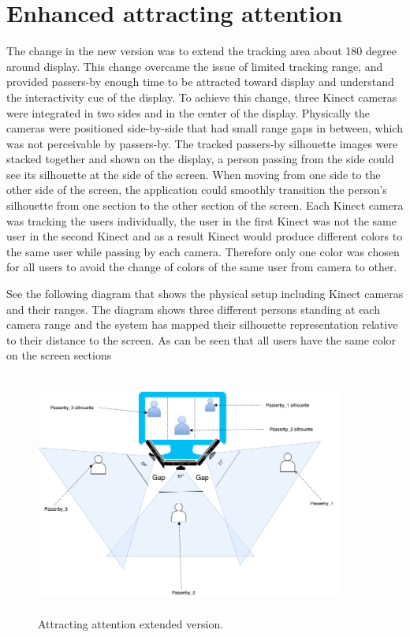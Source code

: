 \section{Enhanced attracting attention}
The change in the new version was to extend the tracking area about 180 degree around display. This change overcame the issue of limited tracking range, and provided passers-by enough time to be attracted toward display and understand the interactivity cue of the display. To achieve this change, three Kinect cameras were integrated in two sides and in the center of the display. Physically the cameras were positioned side-by-side that had small range gaps in between, which was not perceivable by passers-by. The tracked passers-by silhouette images were stacked together and shown on the display, a person passing from the side could see its silhouette at the side of the screen.  When moving from one side to the other side of the screen, the application could smoothly transition the person’s silhouette from one section to the other section of the screen. Each Kinect camera was tracking the users individually, the user in the first Kinect was not the same user in the second Kinect and as a result Kinect would produce different colors to the same user while passing by each camera. Therefore only one color was chosen for all users to avoid the change of colors of the same user from camera to other. 

See the following diagram that shows the physical setup including Kinect cameras and their ranges. The diagram shows three different persons standing at each camera range and the system has mapped their silhouette representation relative to their distance to the screen. As can be seen that all users have the same color on the screen sections 





\begin{figure}[H]
    \centering
    \includegraphics[width=0.9\textwidth,height=8cm]{Figures/9/Kinect_Extended}
    \caption{Attracting attention extended version.}%
    \label{fig:KinectExtended}%
\end{figure}


